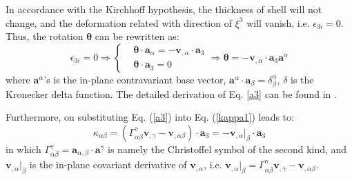 In accordance with the Kirchhoff hypothesis, the thickness of shell will not change, and the deformation related with direction of $\xi^3$ will vanish, i.e. $\epsilon_{3i}=0$. Thus, the rotation $\boldsymbol \theta$ can be rewritten as:
\begin{equation}\label{a3}
\epsilon_{3i} = 0 \Rightarrow
\left \{
\begin{split}
&\boldsymbol \theta \cdot \boldsymbol a_\alpha =- \boldsymbol v_{,\alpha} \cdot \boldsymbol a_3 \\
&\boldsymbol \theta \cdot \boldsymbol a_3 = 0
\end{split}
\right .
\Rightarrow \boldsymbol \theta = - \boldsymbol v_{,\alpha} \cdot \boldsymbol a_3 \boldsymbol a^\alpha
\end{equation}
where $\boldsymbol a^\alpha$'s is the in-plane contravariant base vector, $\boldsymbol a^\alpha \cdot \boldsymbol a_\beta = \delta^\alpha_\beta$, $\delta$ is the Kronecker delta function. The detailed derivation of Eq. \ref{a3} can be found in \cite{benzaken2021}.

Furthermore, on substituting Eq. (\ref{a3}) into Eq. (\ref{kappa1}) leads to:
\begin{equation}
\kappa_{\alpha\beta} = (\Gamma^\gamma_{\alpha\beta} \boldsymbol v_{,\gamma} - \boldsymbol v_{,\alpha\beta}) \cdot \boldsymbol a_3 = - \boldsymbol v_{,\alpha}\vert_\beta \cdot \boldsymbol a_3
\end{equation}
in which $\Gamma^\gamma_{\alpha\beta} = \boldsymbol a_{\alpha,\beta} \cdot \boldsymbol a^\gamma$ is namely the Christoffel symbol of the second kind, and $\boldsymbol v_{,\alpha}\vert_\beta$ is the in-plane covariant derivative of $\boldsymbol v_{,\alpha}$, i.e. $\boldsymbol v_{,\alpha}\vert_\beta = \Gamma^\gamma_{\alpha\beta}\boldsymbol v_{,\gamma} - \boldsymbol v_{,\alpha\beta}$.

